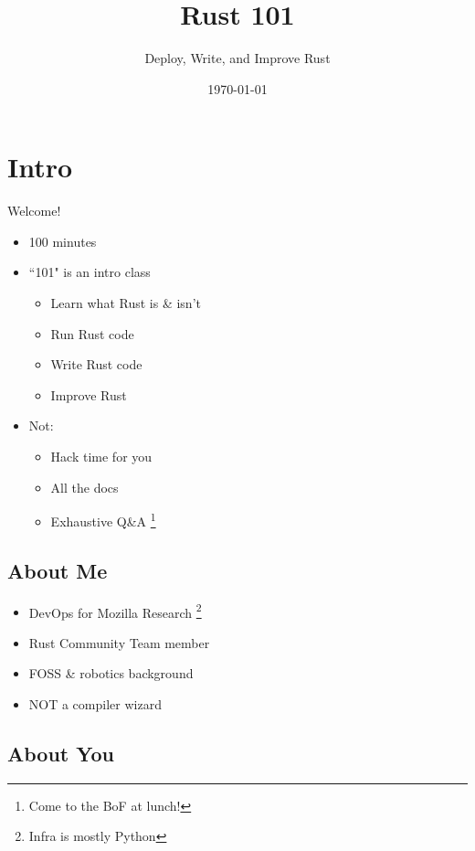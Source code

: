 \documentclass[50pt]{beamer}
\title[Rust 101]{Rust 101}
\subtitle{Deploy, Write, and Improve Rust}
\author{\name}
\date{\today}
\begin{document}
\begin{frame}
\titlepage
\end{frame}

\section{Intro}

\begin{frame}
    Welcome!
     \begin{itemize}
        \item 100 minutes
        \item ``101" is an intro class
        \begin{itemize}
            \item Learn what Rust is \& isn't
            \item Run Rust code
            \item Write Rust code
            \item Improve Rust
        \end{itemize}
        \item Not:
        \begin{itemize}
            \item Hack time for you
            \item All the docs
            \item Exhaustive Q\&A \footnote{Come to the BoF at lunch!}
        \end{itemize}
    \end{itemize}
\end{frame}

\subsection{About Me}

\begin{frame}
    \begin{itemize}
        \item DevOps for Mozilla Research \footnote{Infra is mostly Python}
        \item Rust Community Team member
        \item FOSS \& robotics background
        \item NOT a compiler wizard
    \end{itemize}
\end{frame}

\subsection{About You}
\end{document}
